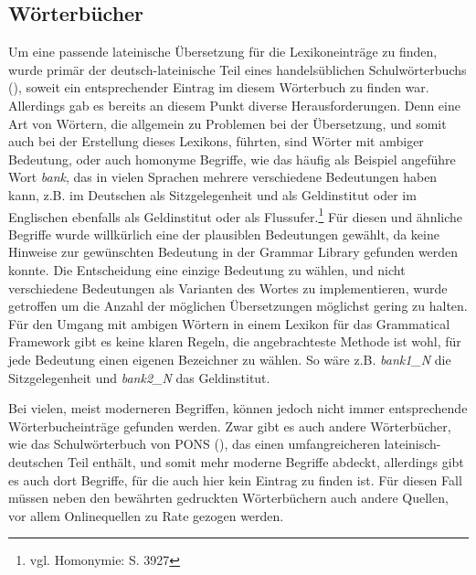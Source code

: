 \documentclass[12pt,abstract=on,titlepage,bibliography=totoc,ngerman,listof=totoc]{scrreprt}
\begin{document}
\subsection{Wörterbücher}
\label{subsec:woerterbuch}
Um eine passende lateinische Übersetzung für die Lexikoneinträge zu finden, wurde primär der deutsch-lateinische Teil eines handelsüblichen Schulwörterbuchs (\cite{LANGENSCHEIDT1981}), soweit ein entsprechender Eintrag im diesem Wörterbuch zu finden war. Allerdings gab es bereits an diesem Punkt diverse Herausforderungen. Denn eine Art von Wörtern, die allgemein zu Problemen bei der Übersetzung, und somit auch bei der Erstellung dieses Lexikons, führten, sind Wörter mit ambiger Bedeutung, oder auch homonyme Begriffe, wie das häufig als Beispiel angeführe Wort \textit{bank}, das in vielen Sprachen mehrere verschiedene Bedeutungen haben kann, z.B. im Deutschen als Sitzgelegenheit und als Geldinstitut oder im Englischen ebenfalls als Geldinstitut oder als Flussufer.\footnote{vgl. \cite{METZLER2004} Homonymie: S. 3927} Für diesen und ähnliche Begriffe wurde willkürlich eine der plausiblen Bedeutungen gewählt, da keine Hinweise zur gewünschten Bedeutung in der Grammar Library gefunden werden konnte. Die Entscheidung eine einzige Bedeutung zu wählen, und nicht verschiedene Bedeutungen als Varianten des Wortes zu implementieren, wurde getroffen um die Anzahl der möglichen Übersetzungen möglichst gering zu halten. Für den Umgang mit ambigen Wörtern in einem Lexikon für das Grammatical Framework gibt es keine klaren Regeln, die angebrachteste Methode ist wohl, für jede Bedeutung einen eigenen Bezeichner zu wählen. So wäre z.B. \textit{bank1\_N} die Sitzgelegenheit und \textit{bank2\_N} das Geldinstitut.\par
Bei vielen, meist moderneren Begriffen, können jedoch nicht immer entsprechende Wörterbucheinträge gefunden werden. Zwar gibt es auch andere Wörterbücher, wie das Schulwörterbuch von PONS (\cite{PONS2012}), das einen umfangreicheren lateinisch-deutschen Teil enthält, und somit mehr moderne Begriffe abdeckt, allerdings gibt es auch dort Begriffe, für die auch hier kein Eintrag zu finden ist. Für diesen Fall müssen neben den bewährten gedruckten Wörterbüchern auch andere Quellen, vor allem Onlinequellen zu Rate gezogen werden.\par
\end{document}
